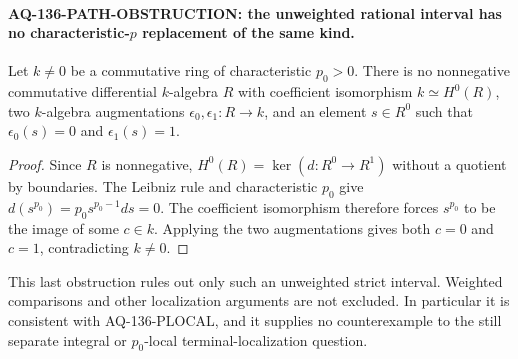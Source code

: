 \paragraph{AQ-136-PATH-OBSTRUCTION: the unweighted rational interval has no characteristic-$p$ replacement of the same kind.}
Let $k\ne0$ be a commutative ring of characteristic
$p_0>0$.  There is no nonnegative commutative differential
$k$-algebra $R$ with coefficient isomorphism
$k\simeq H^0(R)$, two $k$-algebra augmentations
$\epsilon_0,\epsilon_1:R\to k$, and an element
$s\in R^0$ such that $\epsilon_0(s)=0$ and
$\epsilon_1(s)=1$.

\begin{proof}
Since $R$ is nonnegative, $H^0(R)=\ker(d:R^0\to R^1)$
without a quotient by boundaries.  The Leibniz rule and
characteristic $p_0$ give
$d(s^{p_0})=p_0s^{p_0-1}ds=0$.
The coefficient isomorphism therefore forces
$s^{p_0}$ to be the image of some $c\in k$.
Applying the two augmentations gives both $c=0$ and
$c=1$, contradicting $k\ne0$.
\end{proof}

This last obstruction rules out only such an unweighted
strict interval.  Weighted comparisons and other
localization arguments are not excluded.  In particular
it is consistent with AQ-136-PLOCAL, and it supplies no
counterexample to the still separate integral or
$p_0$-local terminal-localization question.
